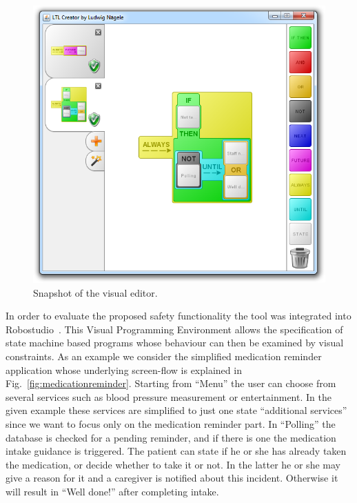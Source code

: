 \documentclass[conference]{IEEEtran}
\begin{document}
\begin{figure}[htbp]
  \centering
  \includegraphics[width=\linewidth]{editor} 
  \caption{Snapshot of the visual editor.}
  \label{fig:editor}
\end{figure}

In order to evaluate the proposed safety functionality the tool was integrated into Robostudio~\cite{robostudio}. This Visual Programming Environment allows the specification of state machine based programs whose behaviour can then be examined by visual constraints. As an example we consider the simplified medication reminder application whose underlying screen-flow is explained in Fig.~\ref{fig:medicationreminder}. Starting from ``Menu'' the user can choose from several services such as blood pressure measurement or entertainment. In the given example these services are simplified to just one state ``additional services'' since we want to focus only on the medication reminder part. In ``Polling'' the database is checked for a pending reminder, and if there is one the medication intake guidance is triggered. The patient can state if he or she has already taken the medication, or decide whether to take it or not. In the latter he or she may give a reason for it and a caregiver is notified about this incident. Otherwise it will result in ``Well done!'' after completing intake.
\end{document}
